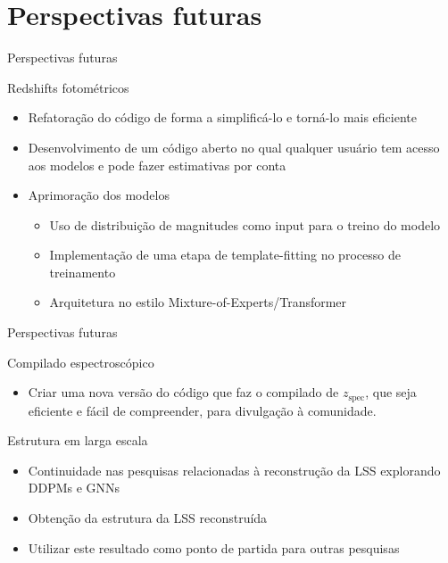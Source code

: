 \section{Perspectivas futuras}
\begin{frame}[c]{Perspectivas futuras}
    \begin{splusbox}{Redshifts fotométricos}
        \small
        \begin{itemize}
            \item Refatoração do código de forma a simplificá-lo e torná-lo mais eficiente
            \item Desenvolvimento de um código aberto no qual qualquer usuário tem acesso aos modelos e pode fazer estimativas por conta
            \item Aprimoração dos modelos
            \begin{itemize}
                \item Uso de distribuição de magnitudes como input para o treino do modelo
                \item Implementação de uma etapa de template-fitting no processo de treinamento
                \item Arquitetura no estilo Mixture-of-Experts/Transformer
            \end{itemize}
        \end{itemize}
    \end{splusbox}
\end{frame}


\begin{frame}[c]{Perspectivas futuras}
    \begin{splusbox}{Compilado espectroscópico}
        \small
        \begin{itemize}
            \item Criar uma nova versão do código que faz o compilado de $z_\text{spec}$, que seja eficiente e fácil de compreender, para divulgação à comunidade.
        \end{itemize}
    \end{splusbox}

    \begin{splusbox}{Estrutura em larga escala}
        \small
        \begin{itemize}
            \item Continuidade nas pesquisas relacionadas à reconstrução da LSS explorando DDPMs e GNNs
            \item Obtenção da estrutura da LSS reconstruída
            \item Utilizar este resultado como ponto de partida para outras pesquisas
        \end{itemize}
    \end{splusbox}
\end{frame}

